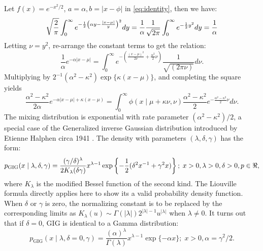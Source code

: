 \documentclass[lineno]{biometrika}
\begin{document}
Let $f(x) = e^{-x^2/2}$, $a = \alpha, b = |x-\phi|$ in \eqref{eq:identity}, then we have: 
$$
\sqrt{\frac{2}{\pi}} \int_{0}^{\infty} e^{-\frac{1}{2} \left(\alpha y - \frac{|x-\mu|}{y} \right)^2} dy = \frac{1}{\alpha}\frac{1}{\sqrt{2\pi}} \int_0^{\infty} e^{-\frac{1}{2} y^2} dy = \frac{1}{\alpha}
$$
Letting $\nu = y^2$, re-arrange the constant terms to get the relation:
$$
\frac{1}{\alpha} e^{-\alpha|x-\mu|} = \int_{0}^{\infty} e^{-\left( \frac{(x-\mu)^2}{2\nu} + \frac{\alpha^2}{2} \nu \right)} \frac{1}{\sqrt{(2\pi\nu)}} d\nu.
$$
Multiplying by $2^{-1}(\alpha^2-\kappa^2) \exp\{\kappa(x-\mu)\}$, and completing the square yields
\begin{equation*}
  \frac{\alpha^2-\kappa^2}{2\alpha} e^{-\alpha|x-\mu| + \kappa(x-\mu)} = \int_0^{\infty} \phi(x \mid \mu + \kappa \nu, \nu) \frac{\alpha^2-\kappa^2}{2} e^{-\frac{\alpha^2-\kappa^2}{2} \nu} d \nu. 
\end{equation*}
The mixing distribution is exponential with rate parameter $(\alpha^2-\kappa^2)/2$, a special case of the Generalized inverse Gaussian distribution introduced by Etienne Halphen circa 1941 \citep{seshadri1997halphen}. The density with parameters $(\lambda, \delta, \gamma)$ has the form: 
\begin{equation*}
p_{\mathrm{GIG}}(x \mid \lambda, \delta, \gamma) = \frac{(\gamma/\delta)^{\lambda}}{2K_{\lambda}(\delta \gamma)} x^{\lambda-1} \exp \left\{ -\frac{1}{2} (\delta^2 x^{-1} + \gamma^2 x )  \right\}; \; x > 0, \lambda >0, \delta > 0,  p \in \Re,
\end{equation*}
where $K_{\lambda}$ is the modified Bessel function of the second kind. The Liouville formula directly applies here to show its a valid probability density function. When $\delta$ or $\gamma$ is zero, the normalizing constant is to be replaced by the corresponding limits as $K_{\lambda}(u) \sim \Gamma(|\lambda|)2^{|\lambda|-1} u^{|\lambda|}$ when $\lambda \neq 0$. It turns out that if $\delta=0$, GIG is identical to a Gamma distribution:
$$
p_{\mathrm{GIG}}(x \mid \lambda, \delta = 0 , \gamma) = \frac{(\alpha)^{\lambda}}{\Gamma(\lambda)} x^{\lambda-1} \exp\{ -\alpha x \}; \; x > 0, \alpha = \gamma^2 / 2.
$$
\end{document}
